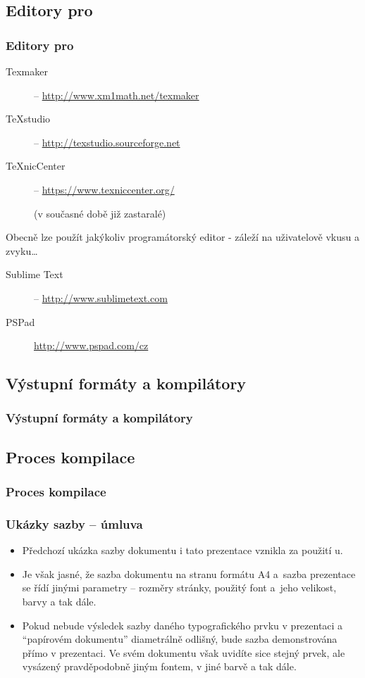 \subsection{Editory pro }
\begin{frame}
	\frametitle{Editory pro }
	\begin{description}
		\item[Texmaker] -- \url{http://www.xm1math.net/texmaker}
		\item[TeXstudio] -- \url{http://texstudio.sourceforge.net}
		\item[TeXnicCenter] -- \url{https://www.texniccenter.org/}\par{}(v současné době již zastaralé)
	\end{description}
	\par
	Obecně lze použít jakýkoliv programátorský editor - záleží na uživatelově vkusu a zvyku\ldots
	\begin{description}
		\item[Sublime Text] -- \url{http://www.sublimetext.com}
		\item[PSPad]\url{http://www.pspad.com/cz}
	\end{description}
\end{frame}


\subsection{Výstupní formáty a kompilátory}
\begin{frame}
	\frametitle{Výstupní formáty a kompilátory}
	\centering
	\resizebox{\textwidth}{!}{}
\end{frame}


\subsection{Proces kompilace}
\begin{frame}
	\frametitle{Proces kompilace}
	\centering
	
\end{frame}


\begin{frame}
	\frametitle{Ukázky sazby -- úmluva}
	\begin{itemize}
		\item Předchozí ukázka sazby dokumentu i tato prezentace vznikla za použití u.
		\item Je však jasné, že sazba dokumentu na stranu formátu A4 a~sazba prezentace se řídí jinými parametry -- rozměry stránky, použitý font a~jeho velikost, barvy a tak dále.
		\item Pokud nebude výsledek sazby daného typografického prvku v prezentaci a \enquote{papírovém dokumentu} diametrálně odlišný, bude sazba demonstrována přímo v prezentaci. Ve svém dokumentu však uvidíte sice stejný prvek, ale vysázený pravděpodobně jiným fontem, v jiné barvě a tak dále.
	\end{itemize}
\end{frame}


